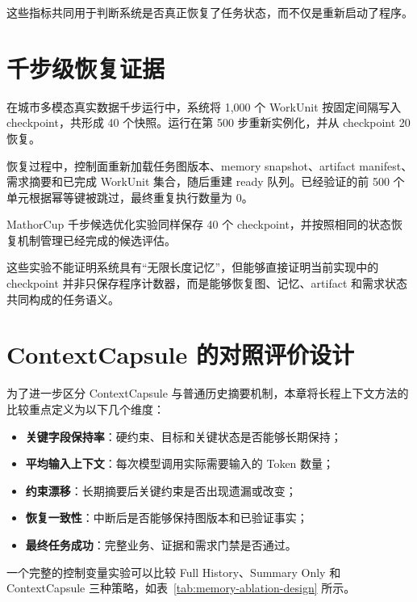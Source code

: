 \documentclass[UTF8,a4paper,12pt,oneside]{ctexbook}
\begin{document}
这些指标共同用于判断系统是否真正恢复了任务状态，而不仅是重新启动了程序。


\section{千步级恢复证据}

在城市多模态真实数据千步运行中，系统将 1,000 个 WorkUnit 按固定间隔写入 checkpoint，共形成 40 个快照。运行在第 500 步重新实例化，并从 checkpoint 20 恢复。

恢复过程中，控制面重新加载任务图版本、memory snapshot、artifact manifest、需求摘要和已完成 WorkUnit 集合，随后重建 ready 队列。已经验证的前 500 个单元根据幂等键被跳过，最终重复执行数量为 0。

MathorCup 千步候选优化实验同样保存 40 个 checkpoint，并按照相同的状态恢复机制管理已经完成的候选评估。

这些实验不能证明系统具有“无限长度记忆”，但能够直接证明当前实现中的 checkpoint 并非只保存程序计数器，而是能够恢复图、记忆、artifact 和需求状态共同构成的任务语义。


\section{ContextCapsule 的对照评价设计}

为了进一步区分 ContextCapsule 与普通历史摘要机制，本章将长程上下文方法的比较重点定义为以下几个维度：

\begin{itemize}
    \item \textbf{关键字段保持率}：硬约束、目标和关键状态是否能够长期保持；
    \item \textbf{平均输入上下文}：每次模型调用实际需要输入的 Token 数量；
    \item \textbf{约束漂移}：长期摘要后关键约束是否出现遗漏或改变；
    \item \textbf{恢复一致性}：中断后是否能够保持图版本和已验证事实；
    \item \textbf{最终任务成功}：完整业务、证据和需求门禁是否通过。
\end{itemize}

一个完整的控制变量实验可以比较 Full History、Summary Only 和 ContextCapsule 三种策略，如表~\ref{tab:memory-ablation-design} 所示。
\end{document}
